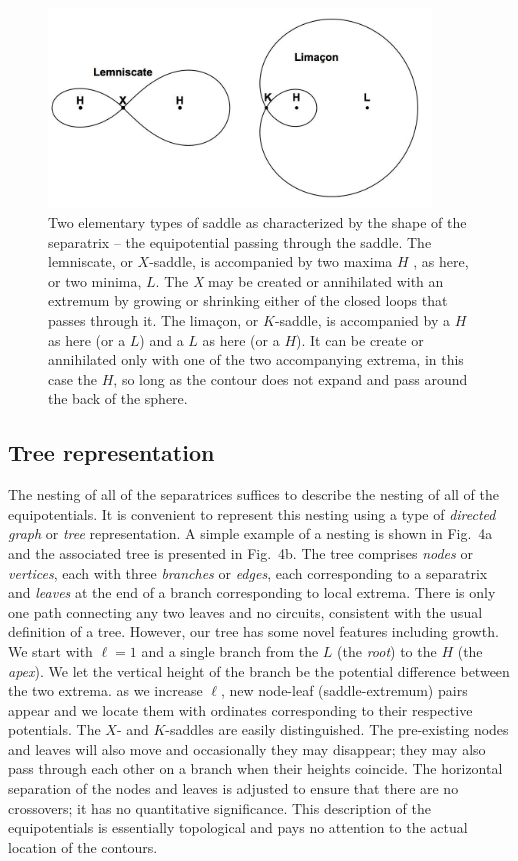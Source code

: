 \documentclass[12pt]{article}
\begin{document}
\begin{figure}[h!]
\centering
\includegraphics[width=4in]{fig3.jpg}
\caption{Two elementary types of saddle as characterized by the shape of the separatrix -- the equipotential passing through the saddle. The lemniscate, or $X$-saddle, is accompanied by two maxima $H$ , as here, or two minima, $L$. The \emph X may be created or annihilated with an extremum by growing or shrinking either of the closed loops that passes through it. The lima\c con, or $K$-saddle, is accompanied by a $H$ as here (or a $L$) and a $L$ as here (or a $H$). It can be create or annihilated only with one of the two accompanying extrema, in this case the $H$, so long as the contour does not expand and pass around the back of the sphere.}
\end{figure}

\subsection{Tree representation}
The nesting of all of the separatrices suffices to describe the nesting of all of the equipotentials. It is convenient to represent this nesting using a type of \emph{directed graph} or \emph{tree} representation. A simple example of a nesting is shown in Fig.~4a and the associated tree is presented in Fig.~4b.  The tree comprises \emph{nodes} or \emph{vertices}, each with three \emph{branches} or \emph{edges}, each corresponding to a separatrix and \emph{leaves} at the end of a branch corresponding to local extrema. There is only one path connecting any two leaves and no circuits, consistent with the usual definition of a tree. However, our tree has some novel features including growth.  We start with $\ell=1$ and a single branch from the $L$ (the \emph{root}) to the $H$ (the \emph{apex}). We let the vertical height of the branch be the potential difference between the two extrema. as we increase $\ell$, new node-leaf (saddle-extremum) pairs appear and we locate them with ordinates corresponding to their respective potentials. The $X$- and $K$-saddles are easily distinguished. The pre-existing nodes and leaves will also move and occasionally they may disappear; they may also pass through each other on a branch when their heights coincide. The horizontal separation of the nodes and leaves is adjusted to ensure that there are no crossovers; it has no quantitative significance. This description of the equipotentials is essentially topological and pays no attention to the actual location of the contours.
\end{document}
